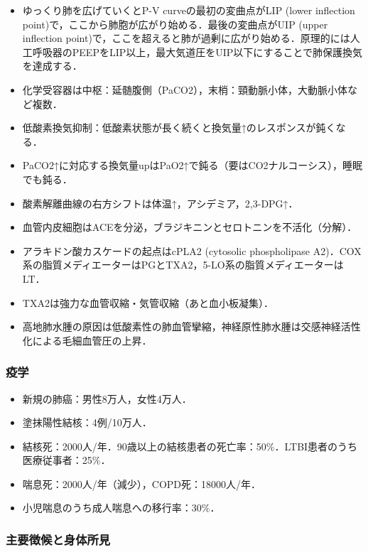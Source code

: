 \begin{itemize}
\item ゆっくり肺を広げていくとP-V curveの最初の変曲点がLIP (lower inflection point)で，ここから肺胞が広がり始める．最後の変曲点がUIP (upper inflection point)で，ここを超えると肺が過剰に広がり始める．原理的には人工呼吸器のPEEPをLIP以上，最大気道圧をUIP以下にすることで肺保護換気を達成する．


\item 化学受容器は中枢：延髄腹側（PaCO2），末梢：頸動脈小体，大動脈小体など複数．
\item 低酸素換気抑制：低酸素状態が長く続くと換気量↑のレスポンスが鈍くなる．
\item PaCO2↑に対応する換気量upはPaO2↑で鈍る（要はCO2ナルコーシス），睡眠でも鈍る．
\item 酸素解離曲線の右方シフトは体温↑，アシデミア，2,3-DPG↑．
\item 血管内皮細胞はACEを分泌，ブラジキニンとセロトニンを不活化（分解）．
\item アラキドン酸カスケードの起点はcPLA2 (cytosolic phospholipase A2)．COX系の脂質メディエーターはPGとTXA2，5-LO系の脂質メディエーターはLT．
\item TXA2は強力な血管収縮・気管収縮（あと血小板凝集）．
\item 高地肺水腫の原因は低酸素性の肺血管攣縮，神経原性肺水腫は交感神経活性化による毛細血管圧の上昇．
\end{itemize}


\subsubsection{疫学}

\begin{itemize}
\item 新規の肺癌：男性8万人，女性4万人．
\item 塗抹陽性結核：4例/10万人．
\item 結核死：2000人/年．90歳以上の結核患者の死亡率：50\%．LTBI患者のうち医療従事者：25\%．
\item 喘息死：2000人/年（減少），COPD死：18000人/年．
\item 小児喘息のうち成人喘息への移行率：30\%．
\end{itemize}


\subsubsection{主要徴候と身体所見}

